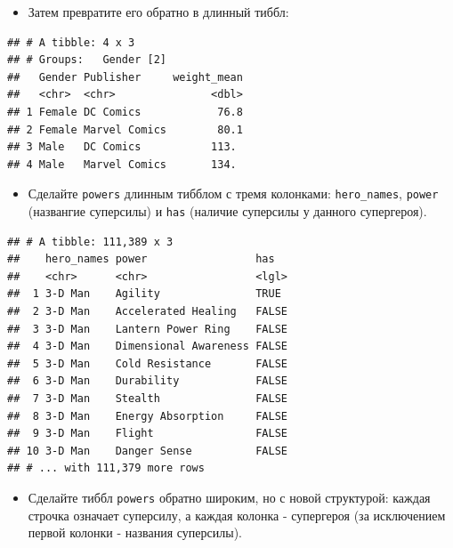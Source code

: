 \documentclass[]{book}
\providecommand{\tightlist}{%
  \setlength{\itemsep}{0pt}\setlength{\parskip}{0pt}}
\begin{document}
\begin{itemize}
\tightlist
\item
  Затем превратите его обратно в длинный тиббл:
\end{itemize}

\begin{verbatim}
## # A tibble: 4 x 3
## # Groups:   Gender [2]
##   Gender Publisher     weight_mean
##   <chr>  <chr>               <dbl>
## 1 Female DC Comics            76.8
## 2 Female Marvel Comics        80.1
## 3 Male   DC Comics           113. 
## 4 Male   Marvel Comics       134.
\end{verbatim}

\begin{itemize}
\tightlist
\item
  Сделайте \texttt{powers} длинным тибблом с тремя колонками:
  \texttt{hero\_names}, \texttt{power} (названгие суперсилы) и
  \texttt{has} (наличие суперсилы у данного супергероя).
\end{itemize}

\begin{verbatim}
## # A tibble: 111,389 x 3
##    hero_names power                 has  
##    <chr>      <chr>                 <lgl>
##  1 3-D Man    Agility               TRUE 
##  2 3-D Man    Accelerated Healing   FALSE
##  3 3-D Man    Lantern Power Ring    FALSE
##  4 3-D Man    Dimensional Awareness FALSE
##  5 3-D Man    Cold Resistance       FALSE
##  6 3-D Man    Durability            FALSE
##  7 3-D Man    Stealth               FALSE
##  8 3-D Man    Energy Absorption     FALSE
##  9 3-D Man    Flight                FALSE
## 10 3-D Man    Danger Sense          FALSE
## # ... with 111,379 more rows
\end{verbatim}

\begin{itemize}
\tightlist
\item
  Сделайте тиббл \texttt{powers} обратно широким, но с новой структурой:
  каждая строчка означает суперсилу, а каждая колонка - супергероя (за
  исключением первой колонки - названия суперсилы).
\end{itemize}
\end{document}
